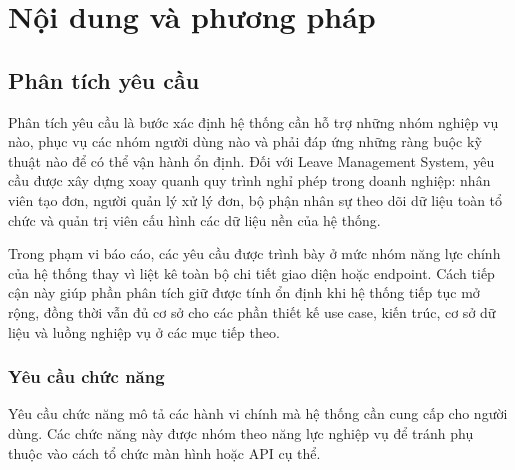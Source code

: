 \chapter{Nội dung và phương pháp}

\section{Phân tích yêu cầu}
Phân tích yêu cầu là bước xác định hệ thống cần hỗ trợ những nhóm nghiệp vụ nào, phục vụ các nhóm người dùng nào và phải đáp ứng những ràng buộc kỹ thuật nào để có thể vận hành ổn định. Đối với Leave Management System, yêu cầu được xây dựng xoay quanh quy trình nghỉ phép trong doanh nghiệp: nhân viên tạo đơn, người quản lý xử lý đơn, bộ phận nhân sự theo dõi dữ liệu toàn tổ chức và quản trị viên cấu hình các dữ liệu nền của hệ thống.

Trong phạm vi báo cáo, các yêu cầu được trình bày ở mức nhóm năng lực chính của hệ thống thay vì liệt kê toàn bộ chi tiết giao diện hoặc endpoint. Cách tiếp cận này giúp phần phân tích giữ được tính ổn định khi hệ thống tiếp tục mở rộng, đồng thời vẫn đủ cơ sở cho các phần thiết kế use case, kiến trúc, cơ sở dữ liệu và luồng nghiệp vụ ở các mục tiếp theo.

\subsection{Yêu cầu chức năng}
Yêu cầu chức năng mô tả các hành vi chính mà hệ thống cần cung cấp cho người dùng. Các chức năng này được nhóm theo năng lực nghiệp vụ để tránh phụ thuộc vào cách tổ chức màn hình hoặc API cụ thể.

